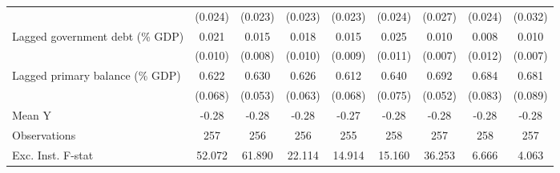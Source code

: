 {\begin{tabular}{l*{8}{c}}
                    &     (0.024)         &     (0.023)         &     (0.023)         &     (0.023)         &     (0.024)         &     (0.027)         &     (0.024)         &     (0.032)         \\
\addlinespace
Lagged government debt (\% GDP)&       0.021\sym{**} &       0.015\sym{*}  &       0.018\sym{*}  &       0.015\sym{*}  &       0.025\sym{**} &       0.010         &       0.008         &       0.010         \\
                    &     (0.010)         &     (0.008)         &     (0.010)         &     (0.009)         &     (0.011)         &     (0.007)         &     (0.012)         &     (0.007)         \\
\addlinespace
Lagged primary balance (\% GDP)&       0.622\sym{***}&       0.630\sym{***}&       0.626\sym{***}&       0.612\sym{***}&       0.640\sym{***}&       0.692\sym{***}&       0.684\sym{***}&       0.681\sym{***}\\
                    &     (0.068)         &     (0.053)         &     (0.063)         &     (0.068)         &     (0.075)         &     (0.052)         &     (0.083)         &     (0.089)         \\
\midrule
Mean Y              &       -0.28         &       -0.28         &       -0.28         &       -0.27         &       -0.28         &       -0.28         &       -0.28         &       -0.28         \\
Observations        &         257         &         256         &         256         &         255         &         258         &         257         &         258         &         257         \\
Exc. Inst. F-stat   &      52.072         &      61.890         &      22.114         &      14.914         &      15.160         &      36.253         &       6.666         &       4.063         \\
\bottomrule
\end{tabular}
}
